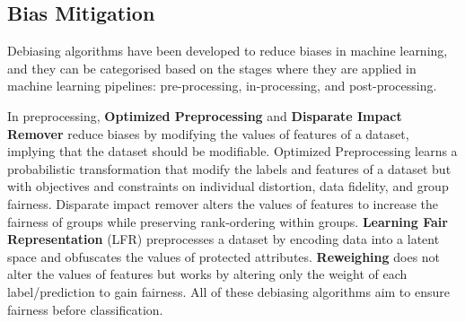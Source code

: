 \documentclass[sigconf,review]{acmart}
\begin{document}
\subsection{Bias Mitigation}
\label{sec:bias_mitigation}

Debiasing algorithms have been developed to reduce biases in machine learning, and they can be categorised based on the stages where they are applied in machine learning pipelines: pre-processing, in-processing, and post-processing. 

In preprocessing, \textbf{Optimized Preprocessing} \cite{calmon2017optimized} and \textbf{Disparate Impact Remover} \cite{feldman2015disparate} reduce biases by modifying the values of features of a dataset, implying that the dataset should be modifiable. 
Optimized Preprocessing learns a probabilistic transformation that modify the labels and features of a dataset but with objectives and constraints on individual distortion, data fidelity, and group fairness.
Disparate impact remover alters the values of features to increase the fairness of groups while preserving rank-ordering within groups.
\textbf{Learning Fair Representation} (LFR) \cite{zemel2013lfr} preprocesses a dataset by encoding data into a latent space and obfuscates the values of protected attributes.
\textbf{Reweighing} \cite{kamiran2011reweighing} does not alter the values of features but works by altering only the weight of each label/prediction to gain fairness. All of these debiasing algorithms aim to ensure fairness before classification.
\end{document}
